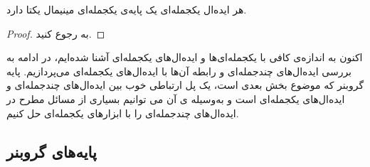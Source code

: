 \begin{proposition}
	\label{unique of minimal monoideal basis}
هر ایده‌ال یکجمله‌ای یک پایه‌ی یکجمله‌ای مینیمال یکتا دارد.
\end{proposition}
\begin{proof}
به 
{\small \cite[ص، ۷۴]{IVAcox}}
رجوع کنید.
\end{proof}
اکنون به اندازه‌ی کافی با یکجمله‌ای‌ها و ایده‌ال‌های یکجمله‌ای آشنا شده‌ایم، در ادامه به بررسی ایده‌ال‌های چندجمله‌ای و رابطه‌  آن‌ها با ایده‌ال‌های یکجمله‌ای می‌پردازیم. پایه‌  گروبنر که موضوع بخش بعدی است، یک پل ارتباطی خوب بین ایده‌ال‌های چندجمله‌ای و ایده‌ال‌های یکجمله‌‌ای است و به‌وسیله ‌ی آن می توانیم بسیاری از مسائل مطرح در ایده‌ال‌های چندجمله‌ای را با ابزارهای یکجمله‌ای حل کنیم.

\subsection*{پایه‌های گروبنر}

